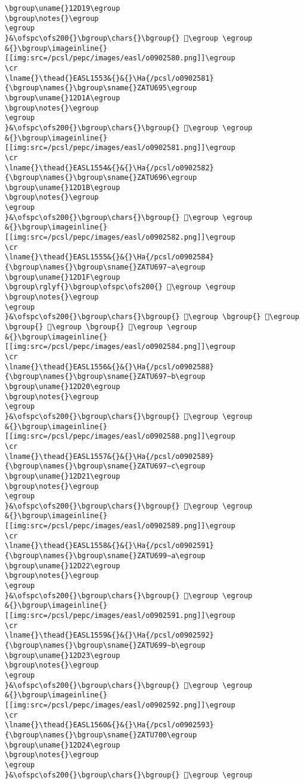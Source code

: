 \begin{verbatim}
\bgroup\uname{}12D19\egroup
\bgroup\notes{}\egroup
\egroup
}&\ofspc\ofs200{}\bgroup\chars{}\bgroup{} 𒴙\egroup \egroup
&{}\bgroup\imageinline{}[[img:src=/pcsl/pepc/images/easl/o0902580.png]]\egroup
\cr
\lname{}\thead{}EASL1553&{}&{}\Ha{/pcsl/o0902581}{\bgroup\names{}\bgroup\sname{}ZATU695\egroup
\bgroup\uname{}12D1A\egroup
\bgroup\notes{}\egroup
\egroup
}&\ofspc\ofs200{}\bgroup\chars{}\bgroup{} 𒴚\egroup \egroup
&{}\bgroup\imageinline{}[[img:src=/pcsl/pepc/images/easl/o0902581.png]]\egroup
\cr
\lname{}\thead{}EASL1554&{}&{}\Ha{/pcsl/o0902582}{\bgroup\names{}\bgroup\sname{}ZATU696\egroup
\bgroup\uname{}12D1B\egroup
\bgroup\notes{}\egroup
\egroup
}&\ofspc\ofs200{}\bgroup\chars{}\bgroup{} 𒴛\egroup \egroup
&{}\bgroup\imageinline{}[[img:src=/pcsl/pepc/images/easl/o0902582.png]]\egroup
\cr
\lname{}\thead{}EASL1555&{}&{}\Ha{/pcsl/o0902584}{\bgroup\names{}\bgroup\sname{}ZATU697∼a\egroup
\bgroup\uname{}12D1F\egroup
\bgroup\rglyf{}\bgroup\ofspc\ofs200{} 𒴟\egroup \egroup
\bgroup\notes{}\egroup
\egroup
}&\ofspc\ofs200{}\bgroup\chars{}\bgroup{} 𒴜\egroup \bgroup{} 𒴝\egroup \bgroup{} 𒴞\egroup \bgroup{} 𒴟\egroup \egroup
&{}\bgroup\imageinline{}[[img:src=/pcsl/pepc/images/easl/o0902584.png]]\egroup
\cr
\lname{}\thead{}EASL1556&{}&{}\Ha{/pcsl/o0902588}{\bgroup\names{}\bgroup\sname{}ZATU697∼b\egroup
\bgroup\uname{}12D20\egroup
\bgroup\notes{}\egroup
\egroup
}&\ofspc\ofs200{}\bgroup\chars{}\bgroup{} 𒴠\egroup \egroup
&{}\bgroup\imageinline{}[[img:src=/pcsl/pepc/images/easl/o0902588.png]]\egroup
\cr
\lname{}\thead{}EASL1557&{}&{}\Ha{/pcsl/o0902589}{\bgroup\names{}\bgroup\sname{}ZATU697∼c\egroup
\bgroup\uname{}12D21\egroup
\bgroup\notes{}\egroup
\egroup
}&\ofspc\ofs200{}\bgroup\chars{}\bgroup{} 𒴡\egroup \egroup
&{}\bgroup\imageinline{}[[img:src=/pcsl/pepc/images/easl/o0902589.png]]\egroup
\cr
\lname{}\thead{}EASL1558&{}&{}\Ha{/pcsl/o0902591}{\bgroup\names{}\bgroup\sname{}ZATU699∼a\egroup
\bgroup\uname{}12D22\egroup
\bgroup\notes{}\egroup
\egroup
}&\ofspc\ofs200{}\bgroup\chars{}\bgroup{} 𒴢\egroup \egroup
&{}\bgroup\imageinline{}[[img:src=/pcsl/pepc/images/easl/o0902591.png]]\egroup
\cr
\lname{}\thead{}EASL1559&{}&{}\Ha{/pcsl/o0902592}{\bgroup\names{}\bgroup\sname{}ZATU699∼b\egroup
\bgroup\uname{}12D23\egroup
\bgroup\notes{}\egroup
\egroup
}&\ofspc\ofs200{}\bgroup\chars{}\bgroup{} 𒴣\egroup \egroup
&{}\bgroup\imageinline{}[[img:src=/pcsl/pepc/images/easl/o0902592.png]]\egroup
\cr
\lname{}\thead{}EASL1560&{}&{}\Ha{/pcsl/o0902593}{\bgroup\names{}\bgroup\sname{}ZATU700\egroup
\bgroup\uname{}12D24\egroup
\bgroup\notes{}\egroup
\egroup
}&\ofspc\ofs200{}\bgroup\chars{}\bgroup{} 𒴤\egroup \egroup

\end{verbatim}
